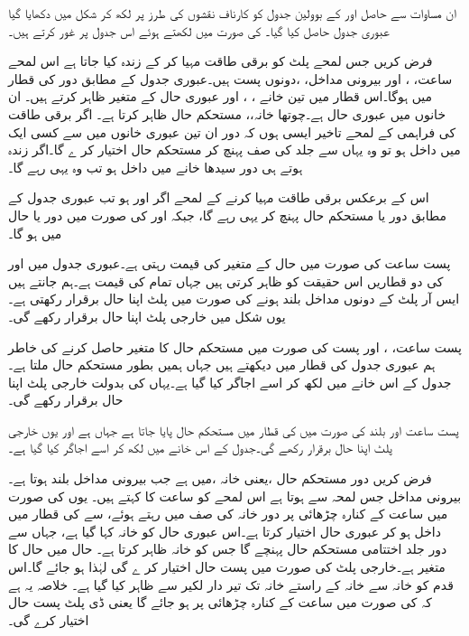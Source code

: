  ان مساوات سے حاصل  اور  کے بوولین جدول کو کارناف نقشوں کی طرز پر لکھ کر شکل میں دکھایا گیا عبوری جدول حاصل کیا گیا۔  کی صورت میں لکھتے ہوئے اس جدول پر غور کرتے ہیں۔


فرض کریں جس لمحے پلٹ کو برقی طاقت مہیا کر کے زندہ کیا جاتا ہے اس لمحے ساعت، ، اور بیرونی مداخل،  ،دونوں پست ہیں۔عبوری جدول کے مطابق دور  کی قطار میں ہوگا۔اس قطار میں تین خانے ، ، اور  عبوری حال کے متغیر ظاہر کرتے ہیں۔ ان خانوں میں عبوری حال  ہے۔چوتھا خانہ،، مستحکم حال  ظاہر کرتا ہے۔ اگر برقی طاقت کی فراہمی کے لمحے تاخیر ایسی ہوں کہ دور ان تین عبوری خانوں میں سے کسی ایک میں داخل ہو تو وہ یہاں سے جلد  کی صف پہنچ کر مستحکم حال اختیار کر ے گا۔اگر زندہ ہوتے ہی دور سیدھا  خانے میں داخل ہو تب وہ یہی رہے گا۔

اس کے برعکس برقی طاقت مہیا کرنے کے لمحے اگر  اور  ہو تب عبوری جدول کے مطابق دور  یا  مستحکم حال پہنچ کر یہی رہے گا، جبکہ  اور  کی صورت میں دور  یا  حال میں ہو گا۔

پست ساعت کی صورت میں حال کے متغیر  کی قیمت  رہتی ہے۔عبوری جدول میں  اور  کی دو قطاریں اس حقیقت کو ظاہر کرتی ہیں جہاں تمام  کی قیمت  ہے۔ہم جانتے ہیں ایس آر پلٹ کے دونوں مداخل بلند ہونے کی صورت میں پلٹ اپنا حال برقرار رکھتی ہے۔یوں شکل  میں خارجی پلٹ اپنا حال برقرار رکھے گی۔

پست ساعت، ، اور پست  کی صورت میں مستحکم حال کا متغیر  حاصل کرنے کی خاطر ہم عبوری جدول کی  قطار میں دیکھتے ہیں جہاں ہمیں   بطور مستحکم حال ملتا ہے۔جدول کے اس خانے میں  لکھ کر اسے اجاگر کیا گیا ہے۔یہاں  کی بدولت خارجی پلٹ اپنا حال برقرار رکھے گی۔

پست ساعت اور بلند  کی صورت میں  کی قطار میں مستحکم حال  پایا جاتا ہے جہاں  ہے اور یوں خارجی پلٹ اپنا حال برقرار رکھے گی۔جدول کے اس خانے میں  لکھ کر اسے اجاگر کیا گیا ہے۔

فرض کریں دور مستحکم حال ،یعنی خانہ  ،میں ہے جب بیرونی مداخل  بلند ہوتا ہے۔بیرونی مداخل  جس لمحہ  سے  ہوتا ہے اس لمحے کو ساعت کا  کہتے ہیں۔ یوں  کی صورت میں ساعت کے کنارہ چڑھائی پر دور خانہ  کی صف میں رہتے ہوئے،  سے  کی قطار میں داخل ہو کر عبوری حال  اختیار کرتا ہے۔اس عبوری حال کو خانہ  کہا گیا ہے، جہاں سے دور جلد اختتامی مستحکم حال  پہنچے گا جس کو خانہ  ظاہر کرتا ہے۔ حال  میں حال کا متغیر  ہے۔خارجی پلٹ  کی صورت میں پست حال اختیار کر ے گی لہٰذا  ہو جائے گا۔اس قدم کو خانہ سے خانہ  کے راستے خانہ  تک تیر دار لکیر سے ظاہر کیا گیا ہے۔ خلاصہ یہ ہے کہ  کی صورت میں ساعت کے کنارہ چڑھائی پر  ہو جائے گا یعنی ڈی پلٹ پست حال اختیار کرے گی۔

